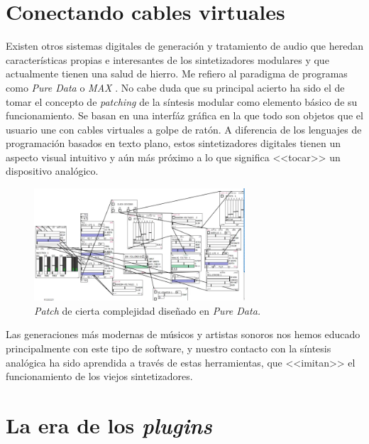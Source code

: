 \section{Conectando cables virtuales}

Existen otros sistemas digitales de generación y tratamiento de audio que heredan características propias e interesantes de los sintetizadores modulares y que actualmente tienen una salud de hierro. Me refiero al paradigma de programas como \emph{Pure Data} \citeyear{pure_data} o \emph{MAX} \citeyear{max}. No cabe duda que su principal acierto ha sido el de tomar el concepto de \emph{patching} de la síntesis modular como elemento básico de su funcionamiento. Se basan en una interfáz gráfica en la que todo son objetos que el usuario une con cables virtuales a golpe de ratón. A diferencia de los lenguajes de programación basados en texto plano, estos sintetizadores digitales tienen un aspecto visual intuitivo y aún más próximo a lo que significa <<tocar>> un dispositivo analógico. 

\begin{figure}
	\centering
	\includegraphics[width=0.7\textwidth]{./puredata_modular}
	\caption[\textit{Patch} en \textit{Pure Data}]{\textit{Patch} de cierta complejidad diseñado en \textit{Pure Data. }}
	\label{fig:puredata_modular}
\end{figure}

Las generaciones más modernas de músicos y artistas sonoros nos hemos educado principalmente con este tipo de software, y nuestro contacto con la síntesis analógica ha sido aprendida a través de estas herramientas, que <<imitan>> el funcionamiento de los viejos sintetizadores.

\section{La era de los \textit{plugins}}
\label{sec:plugins}

